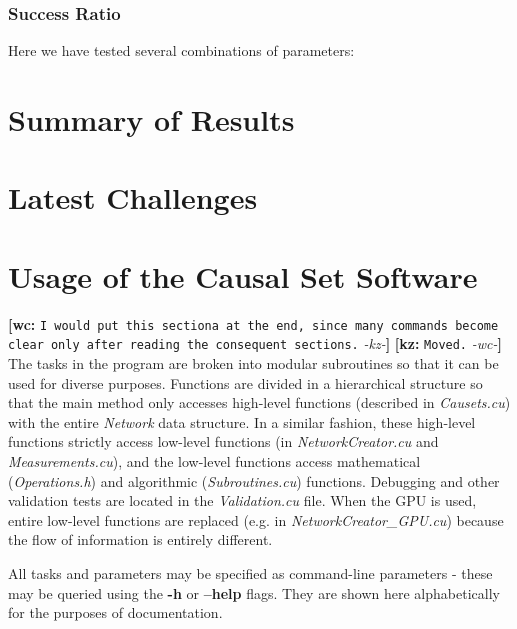 \documentclass[preprint,notitlepage,amsmath,amssymb,floatfix]{revtex4-1}
\newcommand{\XXX}[3]{{\bf [#1: } {\tt #3} {\it -#2-}{\bf ]}}
\begin{document}
\subsubsection{Success Ratio}
Here we have tested several combinations of parameters:


\section{Summary of Results}

\section{Latest Challenges}

\appendix
\appendixpage
\addappheadtotoc

\section{Usage of the Causal Set Software}
\XXX{wc}{kz}{I would put this sectiona at the end, since many commands become clear only after reading the consequent sections.} \XXX{kz}{wc}{Moved.}
The tasks in the program are broken into modular subroutines so that it can be used for diverse purposes.
Functions are divided in a hierarchical structure so that the main method only accesses high-level functions (described in \textit{Causets.cu}) with the entire \textit{Network} data structure.
In a similar fashion, these high-level functions strictly access low-level functions (in \textit{NetworkCreator.cu} and \textit{Measurements.cu}), and the low-level functions access mathematical (\textit{Operations.h}) and algorithmic (\textit{Subroutines.cu}) functions.
Debugging and other validation tests are located in the \textit{Validation.cu} file.
When the GPU is used, entire low-level functions are replaced (e.g. in \textit{NetworkCreator\_GPU.cu}) because the flow of information is entirely different. \par
All tasks and parameters may be specified as command-line parameters - these may be queried using the \textbf{-h} or \textbf{--help} flags.
They are shown here alphabetically for the purposes of documentation.
\end{document}
